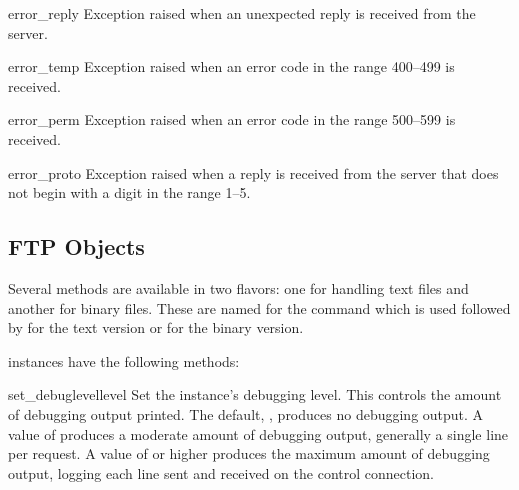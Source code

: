 \begin{excdesc}{error_reply}
Exception raised when an unexpected reply is received from the server.
\end{excdesc}

\begin{excdesc}{error_temp}
Exception raised when an error code in the range 400--499 is received.
\end{excdesc}

\begin{excdesc}{error_perm}
Exception raised when an error code in the range 500--599 is received.
\end{excdesc}

\begin{excdesc}{error_proto}
Exception raised when a reply is received from the server that does
not begin with a digit in the range 1--5.
\end{excdesc}


\begin{seealso}
\end{seealso}


\subsection{FTP Objects \label{ftp-objects}}

Several methods are available in two flavors: one for handling text
files and another for binary files.  These are named for the command
which is used followed by  for the text version or
 for the binary version.

 instances have the following methods:

\begin{methoddesc}{set_debuglevel}{level}
Set the instance's debugging level.  This controls the amount of
debugging output printed.  The default, , produces no
debugging output.  A value of  produces a moderate amount of
debugging output, generally a single line per request.  A value of
 or higher produces the maximum amount of debugging output,
logging each line sent and received on the control connection.
\end{methoddesc}

